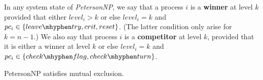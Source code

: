 \documentclass[11pt]{article}
\def \checkflag {check\mhyphen flag}
\def \checkturn {check\mhyphen turn}
\def \leavetry {leave\mhyphen try}
\def \leaveexit {leave\mhyphen exit}
\def \Effect {\qw\text{Effect:}}
\def \Precondition {\qw\text{Precondition:}}
\begin{document}
\begin{Block}{}
\begin{center}
\end{center}
\end{Block}

In any system state of \emph{PetersonNP}, we say that a process \(i\) is a \textbf{winner} at level \(k\) provided
that either \(level_i>k\) or else \(level_i=k\) and \(pc_i\in\{\leavetry,crit,reset\}\). (The latter
condition only arise for \(k=n-1\).) We also say that process \(i\) is a \textbf{competitor} at level \(k\),
provided that it is either a winner at level \(k\) or else \(level_i=k\) and
\(pc_i\in\{\checkflag,\checkturn\}\).


\begin{lemma}[]
PetersonNP satisfies mutual exclusion.
\end{lemma}
\end{document}
